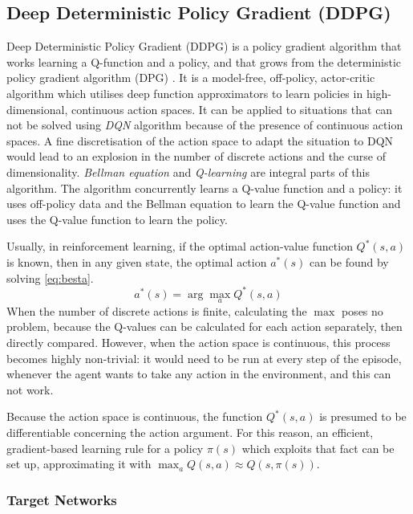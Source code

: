 \subsection{Deep Deterministic Policy Gradient (DDPG)} \label{ddpg}

Deep Deterministic Policy Gradient (DDPG) \cite{lillicrap2015continuous} is a policy gradient algorithm that works learning a Q-function and a policy, and that grows from the deterministic policy gradient algorithm (DPG) \cite{silver2014deterministic}.
It is a model-free, off-policy, actor-critic algorithm which utilises deep function approximators to learn policies in high-dimensional, continuous action spaces.
It can be applied to situations that can not be solved using \textit{DQN} algorithm \cite{mnih2015human} because of the presence of continuous action spaces.
A fine discretisation of the action space to adapt the situation to DQN would lead to an explosion in the number of discrete actions and the curse of dimensionality.
\textit{Bellman equation} and \textit{Q-learning} are integral parts of this algorithm.
The algorithm concurrently learns a Q-value function and a policy: it uses off-policy data and the Bellman equation to learn the Q-value function and uses the Q-value function to learn the policy.

Usually, in reinforcement learning, if the optimal action-value function $Q^*(s,a)$ is known, then in any given state, the optimal action $a^*(s)$ can be found by solving \vref{eq:besta}.
\begin{equation} \label{eq:besta}
	a^*(s) = \arg \max_a Q^*(s,a)
\end{equation}
When the number of discrete actions is finite, calculating the $\max$ poses no problem, because the Q-values can be calculated for each action separately, then directly compared.
However, when the action space is continuous, this process becomes highly non-trivial: it would need to be run at every step of the episode, whenever the agent wants to take any action in the environment, and this can not work.

Because the action space is continuous, the function $Q^*(s,a)$ is presumed to be differentiable concerning the action argument.
For this reason, an efficient, gradient-based learning rule for a policy $\pi(s)$ which exploits that fact can be set up, approximating it with $\max_a Q(s,a) \approx Q(s,\pi(s))$.

\subsubsection{Target Networks} \label{targetnet}

